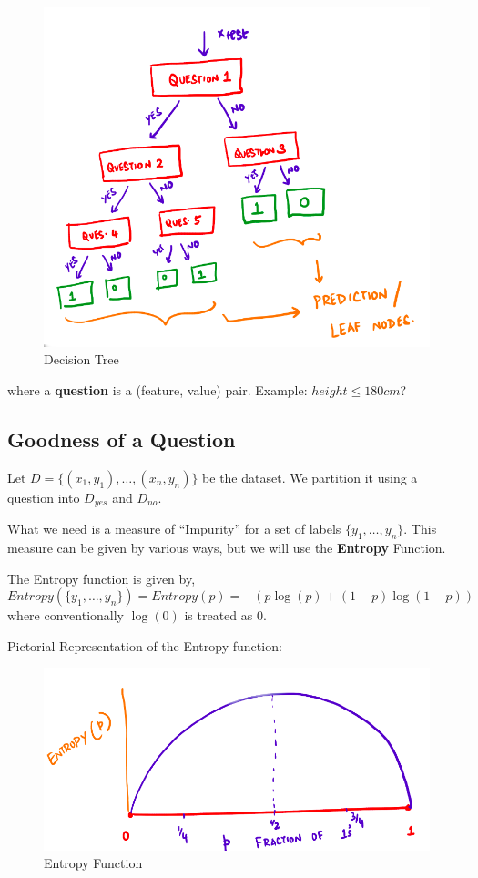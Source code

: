 \documentclass[
]{article}
\begin{document}
\begin{figure}
\centering
\includegraphics{./images/decision_tree.png}
\caption{Decision Tree}
\end{figure}

where a \textbf{question} is a (feature, value) pair. Example:
\(height\le180cm\)?

\hypertarget{goodness-of-a-question}{%
\subsection{Goodness of a Question}\label{goodness-of-a-question}}

Let \(D=\{(x_1, y_1), \ldots, (x_n,y_n)\}\) be the dataset. We partition
it using a question into \(D_{yes}\) and \(D_{no}\).

What we need is a measure of ``Impurity'' for a set of labels
\(\{y_1, \ldots, y_n\}\). This measure can be given by various ways, but
we will use the \textbf{Entropy} Function.

The Entropy function is given by, \[
Entropy(\{y_1, \ldots, y_n\}) = Entropy(p) = -\left( p\log(p)+(1-p)\log(1-p) \right )
\] where conventionally \(\log(0)\) is treated as \(0\).

Pictorial Representation of the Entropy function:

\begin{figure}
\centering
\includegraphics{./images/entropy.png}
\caption{Entropy Function}
\end{figure}
\end{document}
